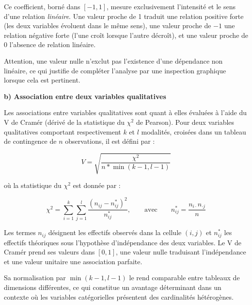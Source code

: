 Ce coefficient, borné dans $[-1, 1]$, mesure exclusivement l'intensité et le sens d'une relation \textit{linéaire}. Une valeur proche de 1 traduit une relation positive forte (les deux variables évoluent dans le même sens), une valeur proche de $-1$ une relation négative forte (l'une croît lorsque l'autre décroît), et une valeur proche de 0 l'absence de relation linéaire.

Attention, une valeur nulle n'exclut pas l'existence d'une dépendance non linéaire, ce qui justifie de compléter l'analyse par une inspection graphique lorsque cela est pertinent.

\vspace{2ex}
\noindent\hspace{1.5em}\textbf{b)	Association entre deux variables qualitatives}
\vspace{1ex}

Les associations entre variables qualitatives sont quant à elles évaluées à l'aide du V de Cramér (dérivé de la statistique du $\chi^2$ de Pearson). Pour deux variables qualitatives comportant respectivement $k$ et $l$ modalités, croisées dans un tableau de contingence de $n$ observations, il est défini par :

\begin{equation}
    V = \sqrt{\frac{\chi^2}{n*\min(k - 1, l - 1)}}
\end{equation}

où la statistique du $\chi^2$ est donnée par :

\begin{equation}
    \chi^2 = \sum_{i=1}^{k} \sum_{j=1}^{l} \frac{(n_{ij} - n_{ij}^*)^2}{n_{ij}^*}, \qquad \text{avec} \qquad n_{ij}^* = \frac{n_{i\cdot} n_{\cdot j}}{n} 
\end{equation}

Les termes $n_{ij}$ désignent les effectifs observés dans la cellule $(i, j)$ et $n_{ij}^*$ les effectifs théoriques sous l'hypothèse d'indépendance des deux variables. Le V de Cramér prend ses valeurs dans $[0, 1]$, une valeur nulle traduisant l'indépendance et une valeur unitaire une association parfaite.

Sa normalisation par $\min(k - 1, l - 1)$ le rend comparable entre tableaux de dimensions différentes, ce qui constitue un avantage déterminant dans un contexte où les variables catégorielles présentent des cardinalités hétérogènes.

